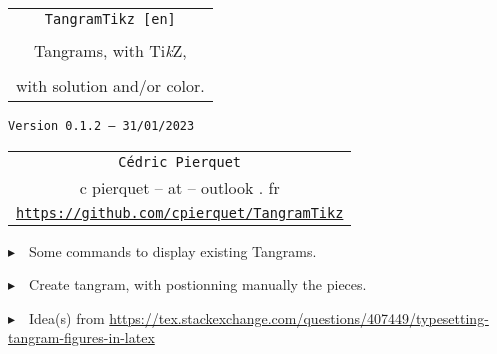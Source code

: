 \documentclass{article}
\def\TPversion{0.1.2}
\def\TPdate{31/01/2023}
\begin{document}
\pagestyle{fancy}

\thispagestyle{empty}

\vspace{2cm}

\begin{center}
	\begin{minipage}{0.75\linewidth}
	\begin{tcolorbox}[colframe=yellow,colback=yellow!15]
		\begin{center}
			\begin{tabular}{c}
				{\Huge \texttt{TangramTikz [en]}}\\
				\\
				{\LARGE Tangrams, with Ti\textit{k}Z}, \\
				\\
				{\LARGE with solution and/or color.} \\
			\end{tabular}
			
			\medskip
			
			{\small \texttt{Version \TPversion{} -- \TPdate}}
		\end{center}
	\end{tcolorbox}
\end{minipage}
\end{center}

\vspace{0.5cm}

\begin{center}
	\begin{tabular}{c}
	\texttt{Cédric Pierquet}\\
	{\ttfamily c pierquet -- at -- outlook . fr}\\
	\texttt{\url{https://github.com/cpierquet/TangramTikz}}
\end{tabular}
\end{center}

\vspace{0.5cm}

{$\blacktriangleright$~~Some commands to display existing Tangrams.}

\smallskip

{$\blacktriangleright$~~Create tangram, with postionning manually the pieces.}

\smallskip

{$\blacktriangleright$~~Idea(s) from \url{https://tex.stackexchange.com/questions/407449/typesetting-tangram-figures-in-latex}}

\vspace{1cm}
\end{document}
